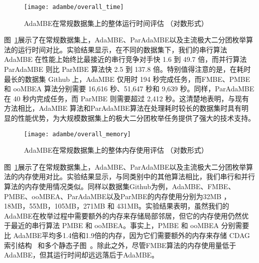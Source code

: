 


\begin{figure} [H]
	\centering
  \vspace{0.05in}
	\texttt{[image: adambe/overall\_time]}
	\caption{AdaMBE在常规数据集上的整体运行时间评估 （对数形式）}

	\label{fig:ada_overall_time}
\end{figure}




图~\ref{fig:ada_overall_time}展示了在常规数据集上，AdaMBE、ParAdaMBE以及主流极大二分团枚举算法的运行时间对比。实验结果显示，在不同的数据集下，我们的串行算法 AdaMBE 在性能上始终比最接近的串行竞争对手快 1.6 到 49.7 倍，而并行算法 ParAdaMBE 则比 ParMBE 算法快 2.5 到 137.8 倍。特别值得注意的是，在耗时最长的数据集 Github 上，AdaMBE 仅用时 194 秒完成任务，而FMBE、PMBE 和 ooMBEA 算法分别需要 16,616 秒、51,647 秒和 9,639 秒。同样，ParAdaMBE 在 40 秒内完成任务，而 ParMBE 则需要超过 2,412 秒。这清楚地表明，与现有方法相比，AdaMBE 算法和ParAdaMBE算法在处理耗时较长的数据集时具有明显的性能优势，为大规模数据集上的极大二分团枚举任务提供了强大的技术支持。

\begin{figure} [t]
	\centering
   \vspace{0.05in}
	\texttt{[image: adambe/overall\_memory]}
	\caption{AdaMBE在常规数据集上的整体内存使用评估 （对数形式）}

	\label{fig:ada_overall_memory}
\end{figure}

图~\ref{fig:ada_overall_time}展示了在常规数据集上，AdaMBE、ParAdaMBE以及主流极大二分团枚举算法的内存使用对比。实验结果显示，与同类别中的其他算法相比，我们串行和并行算法的内存使用情况类似。同样以数据集Github为例，AdaMBE、FMBE、PMBE、ooMBEA、ParAdaMBE以及ParMBE的内存使用分别为32MB ，18MB，55MB，105MB，271MB 和	431MB。实验结果表明，虽然我们的AdaMBE在枚举过程中需要额外的内存来存储局部邻居，但它的内存使用仍然优于最近的串行算法 PMBE 和 ooMBEA。事实上，PMBE 和 ooMBEA 分别需要比 AdaMBE平均多1.4倍和1.9倍的内存，因为它们需要额外的内存来存储 CDAG 索引结构~\cite{PMBE20} 和多个静态子图~\cite{ooMBE22}。除此之外，尽管FMBE算法的内存使用量低于AdaMBE，但其运行时间却远远落后于AdaMBE。

